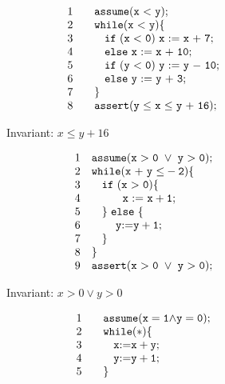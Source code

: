 \begin{figure}[t]
\begin{subfigure}{0.5\textwidth}
    \raggedright
\[
 \begin{array}{ll}
1 & \code{~~~ assume(x~{<}~y);}  \\
2 & \code{~~~ while(x~{<}~y)\{}  \\
3 & \code{~~~ \quad if~(x~{<}~0)~x~{:=}~x~{+}~7;}  \\
4 & \code{~~~ \quad else~ x~{:=}~x~{+}~10;}\\
5 & \code{~~~ \quad if~(y~{<}~0)~y~{:=}~y~{-}~10;} \\
6 & \code{~~~ \quad else~ y~{:=}~y~{+}~3;}\\
7 & \code{~~~\}} \\
8 & \code{~~~assert(y~{\leq}~x~{\leq}~y~{+}~16);}
\end{array}
\]
    \caption{Invariant: $x \le y + 16$}
\end{subfigure}%
\begin{subfigure}{.5\textwidth}
        \[
      \begin{array}{ll}
      1 & \code{assume(x~{>}~0~\lor~y~{>}~0);}  \\
      2 & \code{while(x~{+}~y~{\le}-2)\{}  \\
      3 & \code{\quad if~(x~{>}~0) \{}  \\
      4 & \code{\quad \quad ~~~x~{:=}~x+1;}  \\
      5 & \code{\quad \}~else ~\{} \\
      6 & \code{\quad \quad ~y {:=} y + 1;}\\
      7 & \code{\quad \}} \\
      8 & \code{\}} \\
      9 & \code{assert(x~{>}~0~ \lor ~y~{>}~0);}\\
      \end{array}
    \]
    \caption{Invariant: $x > 0 \lor y > 0$}
\end{subfigure}
   \begin{subfigure}{0.5\textwidth}
    \raggedright
     \vspace{0.3cm}
\[
 \begin{array}{ll}
1 & \code{~~~ assume(x=1 {\land} y=0);}  \\
2 & \code{~~~ while(*)\{}  \\
3 & \code{~~~ \quad x {:=} x + y;}  \\
4 & \code{~~~ \quad y {:=} y + 1;}\\
5 & \code{~~~\}} \\

\end{array}\]
\end{subfigure}
\end{figure}
